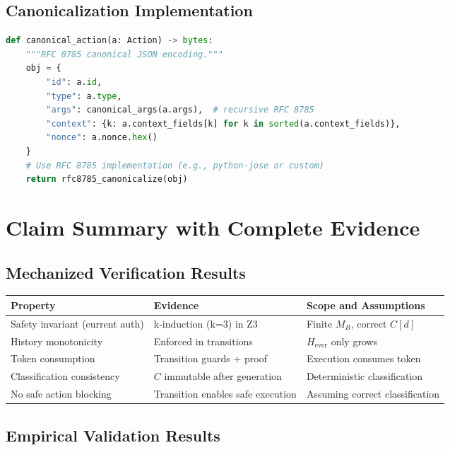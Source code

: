 \documentclass[12pt]{article}
\begin{document}
\subsection{Canonicalization Implementation}

\begin{lstlisting}[language=Python,basicstyle=\scriptsize]
def canonical_action(a: Action) -> bytes:
    """RFC 8785 canonical JSON encoding."""
    obj = {
        "id": a.id,
        "type": a.type,
        "args": canonical_args(a.args),  # recursive RFC 8785
        "context": {k: a.context_fields[k] for k in sorted(a.context_fields)},
        "nonce": a.nonce.hex()
    }
    # Use RFC 8785 implementation (e.g., python-jose or custom)
    return rfc8785_canonicalize(obj)
\end{lstlisting}

\section{Claim Summary with Complete Evidence}

\subsection{Mechanized Verification Results}

\begin{center}
\small
\begin{tabular}{@{}p{}p{}p{}@{}}
\toprule
\textbf{Property} & \textbf{Evidence} & \textbf{Scope and Assumptions} \\
\midrule
Safety invariant (current auth) & k-induction (k=3) in Z3 & Finite $M_B$, correct $C[d]$ \\
History monotonicity & Enforced in transitions & $H_{\text{ever}}$ only grows \\
Token consumption & Transition guards + proof & Execution consumes token \\
Classification consistency & $C$ immutable after generation & Deterministic classification \\
No safe action blocking & Transition enables safe execution & Assuming correct classification \\
\bottomrule
\end{tabular}
\end{center}

\subsection{Empirical Validation Results}
\end{document}

